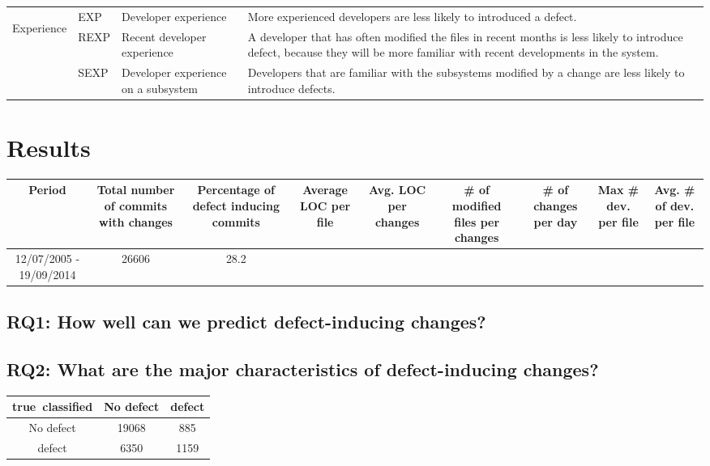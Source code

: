 \documentclass[10pt, conference]{IEEEtran}
\begin{document}
\begin{tabular}{|c|l|p{3cm}|p{6cm}|l|}
	\hline \multirow{3}{*}{\begin{sideways}Experience\end{sideways}} & EXP & Developer experience & More experienced developers are less likely to introduced a defect. &  \\ \cline{2-5} 
	& REXP & Recent developer experience & A developer that has often modified the files in recent months is less likely to introduce defect, because they will be more familiar with recent developments in the system. &  \\ \cline{2-5} 
	& SEXP & Developer experience on a subsystem & Developers that are familiar with the subsystems modified by a change are less likely to introduce defects. &  \\ 
	\hline 
\end{tabular} 

\section{Results}
\label{sec:results}

\begin{tabular}{|c|c|c|c|c|c|c|c|c|}
	\hline 
	Period  & Total number of commits with changes  & Percentage of defect inducing commits  & Average LOC per file  & Avg. LOC per changes  & \# of modified files per changes  & \# of changes per day  & Max \# dev. per file  & Avg. \# of dev. per file \tabularnewline
	\hline 
	12/07/2005 - 19/09/2014  & 26606  & 28.2%
	&  &  &  &  &  & \tabularnewline
\end{tabular}


\subsection{RQ1: How well can we predict defect-inducing changes?}
\label{sec:rq1}


\subsection{RQ2: What are the major characteristics of defect-inducing changes?}
\label{sec:rq2}

\begin{tabular}{|c|c|c|}
	\hline 
	true\ classified  & No defect  & defect \tabularnewline
	\hline 
	No defect  & 19068  & 885 \tabularnewline
	\hline 
	defect  & 6350  & 1159 \tabularnewline
	\hline 
\end{tabular}
\end{document}
